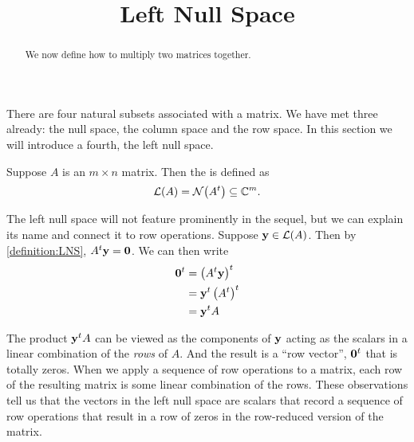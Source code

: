 \documentclass{ximera}
\title{Left Null Space}
\begin{document}
\begin{abstract}
  We now define how to multiply two matrices together.  
\end{abstract}
\maketitle

There are four natural subsets associated with a matrix.  We have met
three already: the null space, the column space and the row space.  In
this section we will introduce a fourth, the left null space. 


\begin{definition}
Suppose $A$ is an $m\times n$ matrix.  Then the  is defined as 
\[
\mathcal{L}\!\left(A\right)=\mathcal{N}\!\left(A^{t}\right)\subseteq\mathbb{C}^{m}.
\]
\end{definition}

The left null space will not feature prominently in the sequel, but we
can explain its name and connect it to row operations.  Suppose
$\mathbf{y}\in\mathcal{L}\!\left(A\right)$.  Then by \ref{definition:LNS},
$A^{t}\mathbf{y}=\mathbf{0}$.  We can then write
\begin{align*}
\transpose{\zerovector}
&=\transpose{\left(\transpose{A}\vect{y}\right)}
\\ %
&=\transpose{\vect{y}}\transpose{\left(\transpose{A}\right)}
\\ %
&=\transpose{\vect{y}}A
\end{align*}

The product $\mathbf{y}^{t}A$ can be viewed as the components of
$\mathbf{y}$ acting as the scalars in a linear combination of the
\textit{rows} of $A$.  And the result is a ``row vector'',
$\mathbf{0}^{t}$ that is totally zeros.  When we apply a
sequence of row operations to a matrix, each row of the resulting
matrix is some linear combination of the rows.  These observations
tell us that the vectors in the left null space are scalars that
record a sequence of row operations that result in a row of zeros in
the row-reduced version of the matrix.
\end{document}
